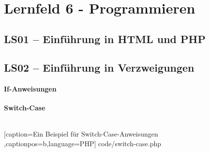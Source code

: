 \section{Lernfeld 6 - Programmieren}

\subsection{LS01 -- Einführung in HTML und PHP}




\subsection{LS02 -- Einführung in Verzweigungen}

\paragraph{If-Anweisungen}
\paragraph{Switch-Case}
\begin{tabular}{l|l|l}

\end{tabular}

	[caption={Ein Beispiel für Switch-Case-Anweisungen}
	\label{lst:Switch-Case},captionpos=b,language=PHP]
	{code/switch-case.php}
